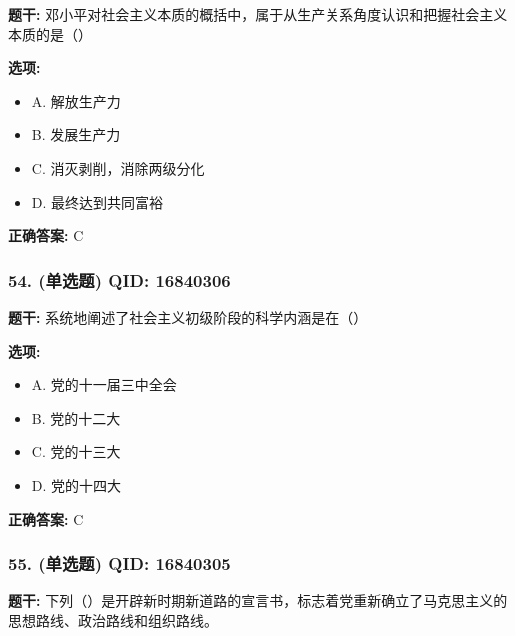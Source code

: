 \documentclass[12pt,UTF8]{ctexart}
\begin{document}
\textbf{题干:}
邓小平对社会主义本质的概括中，属于从生产关系角度认识和把握社会主义本质的是（）

\textbf{选项:}
\begin{itemize}[leftmargin=*]

  \item A. 解放生产力

  \item B. 发展生产力

  \item C. 消灭剥削，消除两级分化

  \item D. 最终达到共同富裕

\end{itemize}

\textbf{正确答案:}
C

\vspace{0.3em}\hrulefill\vspace{0.7em}

\subsubsection*{54. (单选题) \small QID: 16840306}

\textbf{题干:}
系统地阐述了社会主义初级阶段的科学内涵是在（）

\textbf{选项:}
\begin{itemize}[leftmargin=*]

  \item A. 党的十一届三中全会

  \item B. 党的十二大

  \item C. 党的十三大

  \item D. 党的十四大

\end{itemize}

\textbf{正确答案:}
C

\vspace{0.3em}\hrulefill\vspace{0.7em}

\subsubsection*{55. (单选题) \small QID: 16840305}

\textbf{题干:}
下列（）是开辟新时期新道路的宣言书，标志着党重新确立了马克思主义的思想路线、政治路线和组织路线。
\end{document}
